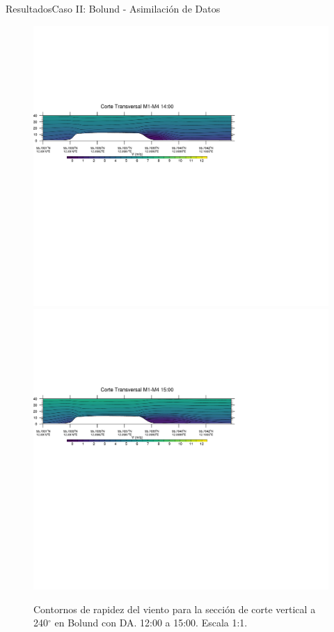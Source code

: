 \documentclass[mathserif,10pt]{beamer}
\begin{document}
\begin{frame}{Resultados}{Caso II: Bolund - Asimilación de Datos}
\begin{figure}[H]
		\includegraphics[width=0.80\linewidth,trim={0mm 202.0mm 111mm 106mm},clip]{fig/06/bol_da/1400rot}\\%
		\includegraphics[width=0.80\linewidth,trim={0mm 180.0mm 111mm 106mm},clip]{fig/06/bol_da/1500rot}%
		\vspace{-2mm}
		\caption{Contornos de rapidez del viento para la sección de corte vertical a 240$^\circ$ en Bolund con DA. 12:00 a 15:00. Escala 1:1.}
		\label{fig:06_bol_da_cross}
	\end{figure}
\end{frame}
\end{document}
